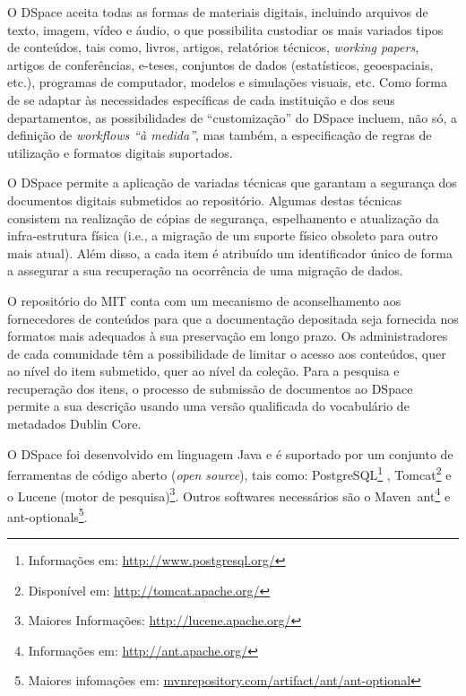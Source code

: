 O DSpace aceita todas as formas de materiais digitais, incluindo arquivos de texto, imagem, vídeo e áudio, o que possibilita custodiar os mais variados tipos de conteúdos, tais como, livros, artigos, relatórios técnicos, \textit{working papers}, artigos de conferências, e-teses, conjuntos de dados (estatísticos, geoespaciais, etc.), programas de computador, modelos e simulações visuais, etc. Como forma de se adaptar às necessidades específicas de cada instituição e dos seus departamentos, as possibilidades de “customização” do DSpace incluem, não só, a definição de \textit{workflows “à medida”}, mas também, a especificação de regras de utilização e formatos digitais suportados.

O DSpace permite a aplicação de variadas técnicas que garantam a segurança dos documentos digitais submetidos ao repositório. Algumas destas técnicas consistem na realização de cópias de segurança, espelhamento e atualização da infra-estrutura física (i.e., a migração de um suporte físico obsoleto para outro mais atual). Além disso, a cada item é atribuído um identificador único de forma a assegurar a sua recuperação na ocorrência de uma migração de dados.

O repositório do MIT conta com um mecanismo de aconselhamento aos fornecedores de conteúdos para que a documentação depositada seja fornecida nos formatos mais adequados à sua preservação em longo prazo. Os administradores de cada comunidade têm a possibilidade de limitar o acesso aos conteúdos, quer ao nível do item submetido, quer ao nível da coleção. Para a pesquisa e recuperação dos itens, o processo de submissão de documentos ao DSpace permite a sua descrição usando uma versão qualificada do vocabulário de metadados Dublin Core.

O DSpace foi desenvolvido em linguagem Java e é suportado por um conjunto de ferramentas de código aberto (\textit{open source}), tais como: PostgreSQL\footnote{Informações em: \url{http://www.postgresql.org/}} , Tomcat\footnote{Disponível em: \url{http://tomcat.apache.org/}} e o Lucene (motor de pesquisa)\footnote{Maiores Informações: \url{http://lucene.apache.org/}}. Outros softwares necessários são o Maven\, ant\footnote{Informações em: \url{http://ant.apache.org/}} e ant-optionals\footnote{Maiores infomações em: \url{mvnrepository.com/artifact/ant/ant-optional}}.


